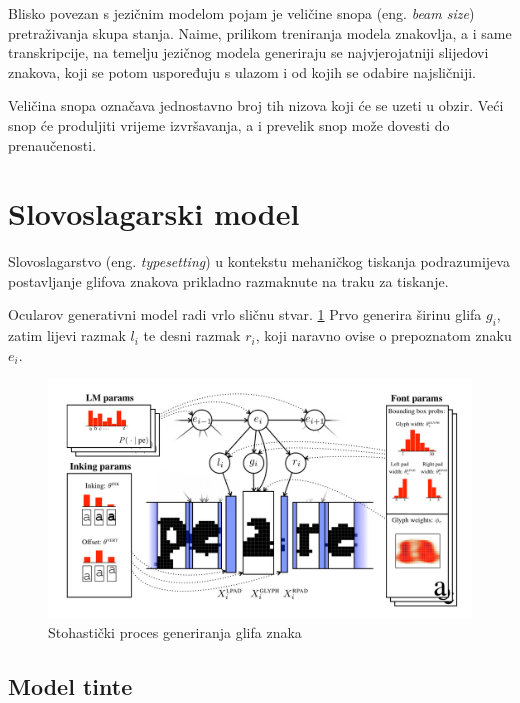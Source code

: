 \documentclass[zavrsnirad]{fer}
\begin{document}
Blisko povezan s jezičnim modelom pojam je veličine snopa (eng. \textit{beam size}) pretraživanja skupa stanja. Naime, prilikom treniranja modela znakovlja, a i same transkripcije, na temelju jezičnog modela generiraju se najvjerojatniji slijedovi znakova, koji se potom uspoređuju s ulazom i od kojih se odabire najsličniji.

Veličina snopa označava jednostavno broj tih nizova koji će se uzeti u obzir. \cite{Berg2014} Veći snop će produljiti vrijeme izvršavanja, a i prevelik snop može dovesti do prenaučenosti.


\section{Slovoslagarski model}

	
Slovoslagarstvo (eng. \textit{typesetting}) u kontekstu mehaničkog tiskanja podrazumijeva postavljanje glifova znakova prikladno razmaknute na traku za tiskanje.

Ocularov generativni model radi vrlo sličnu stvar. \ref{fig:typesetting-model} Prvo generira širinu glifa $g_i$, zatim lijevi razmak $l_i$ te desni razmak $r_i$, koji naravno ovise o prepoznatom znaku $e_i$.

\begin{figure}[H]
	\centering
	\includegraphics[width=1.0\linewidth]{Figures/typesetting-model.png} 
	\caption{Stohastički proces generiranja glifa znaka \cite{Berg2013}}
	\label{fig:typesetting-model}
\end{figure}


\subsection{Model tinte}
\end{document}
